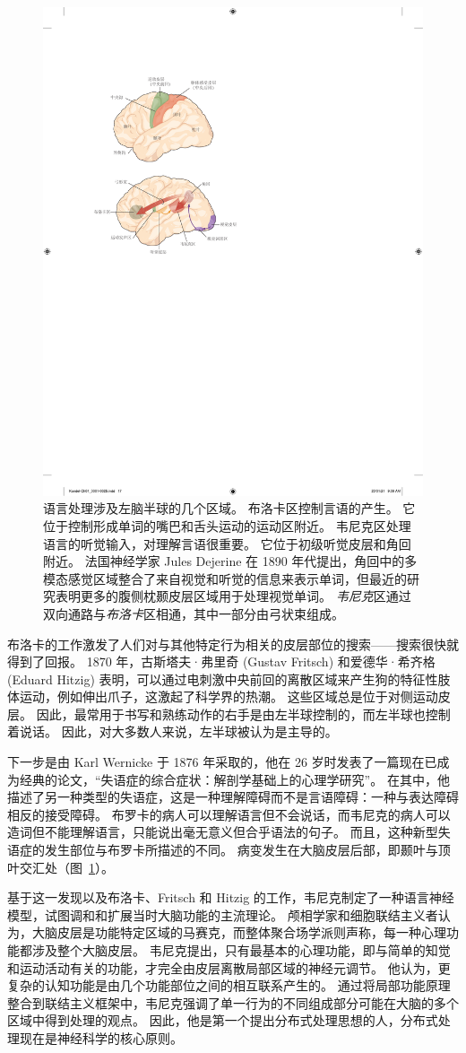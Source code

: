 \begin{figure}[htbp]
	\centering
	\includegraphics[width=0.5\linewidth]{chap01/fig_1_6}
	\caption{语言处理涉及左脑半球的几个区域。
		布洛卡区控制言语的产生。
		它位于控制形成单词的嘴巴和舌头运动的运动区附近。
		韦尼克区处理语言的听觉输入，对理解言语很重要。
		它位于初级听觉皮层和角回附近。
		法国神经学家 Jules Dejerine 在 1890 年代提出，角回中的多模态感觉区域整合了来自视觉和听觉的信息来表示单词，但最近的研究表明更多的腹侧枕颞皮层区域用于处理视觉单词。
		\textit{韦尼克}区通过双向通路与\textit{布洛卡}区相通，其中一部分由弓状束组成\cite{geschwind1979specializations}。}
	\label{fig:1_6}
\end{figure}


布洛卡的工作激发了人们对与其他特定行为相关的皮层部位的搜索——搜索很快就得到了回报。
1870 年，古斯塔夫·弗里奇 (Gustav Fritsch) 和爱德华·希齐格 (Eduard Hitzig) 表明，可以通过电刺激中央前回的离散区域来产生狗的特征性肢体运动，例如伸出爪子，这激起了科学界的热潮。
这些区域总是位于对侧运动皮层。
因此，最常用于书写和熟练动作的右手是由左半球控制的，而左半球也控制着说话。
因此，对大多数人来说，左半球被认为是主导的。


下一步是由 Karl Wernicke 于 1876 年采取的，他在 26 岁时发表了一篇现在已成为经典的论文，“失语症的综合症状：解剖学基础上的心理学研究”。
在其中，他描述了另一种类型的失语症，这是一种理解障碍而不是言语障碍：一种与表达障碍相反的接受障碍。 布罗卡的病人可以理解语言但不会说话，而韦尼克的病人可以造词但不能理解语言，只能说出毫无意义但合乎语法的句子。
而且，这种新型失语症的发生部位与布罗卡所描述的不同。
病变发生在大脑皮层后部，即颞叶与顶叶交汇处（图~\ref{fig:1_6}）。


基于这一发现以及布洛卡、Fritsch 和 Hitzig 的工作，韦尼克制定了一种语言神经模型，试图调和和扩展当时大脑功能的主流理论。
颅相学家和细胞联结主义者认为，大脑皮层是功能特定区域的马赛克，而整体聚合场学派则声称，每一种心理功能都涉及整个大脑皮层。
韦尼克提出，只有最基本的心理功能，即与简单的知觉和运动活动有关的功能，才完全由皮层离散局部区域的神经元调节。
他认为，更复杂的认知功能是由几个功能部位之间的相互联系产生的。
通过将局部功能原理整合到联结主义框架中，韦尼克强调了单一行为的不同组成部分可能在大脑的多个区域中得到处理的观点。
因此，他是第一个提出分布式处理思想的人，分布式处理现在是神经科学的核心原则。


